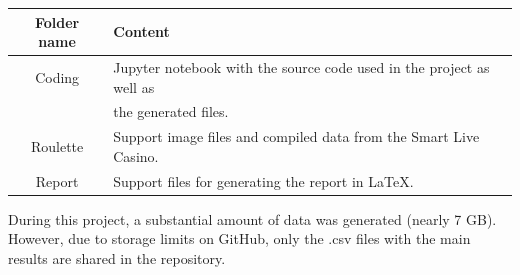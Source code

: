 \documentclass[11pt,twoside]{article}
\numberwithin{Theorem}{section}
\numberwithin{Definition}{section}
\numberwithin{Lemma}{section}
\numberwithin{Algorithm}{section}
\numberwithin{equation}{section}
\begin{document}
\begin{tabular}{|c|l|}
\hline
Folder name & Content \\
\hline\hline
Coding & Jupyter notebook with the source code used in the project as well as \\
& the generated files. \\
Roulette & Support image files and compiled data from the Smart Live Casino. \\
Report & Support files for generating the report in LaTeX. \\
\hline
\end{tabular}

\vspace{2em}
During this project, a substantial amount of data was generated (nearly 7 GB). However, due to storage limits on GitHub, only the .csv files with the main results are shared in the repository.
\clearpage
\end{document}
